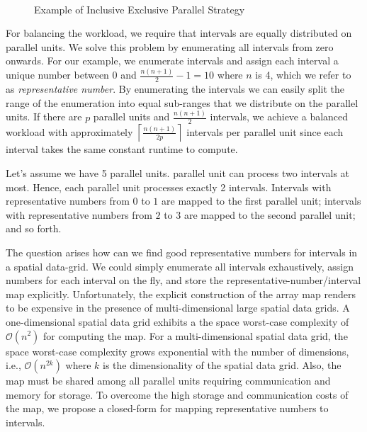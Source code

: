 \documentclass[AMA,LATO1COL]{WileyNJD-v2}
\newcommand\bigo{\mathcal O}
\begin{document}
\begin{figure}[t]
\centering
{}
~~\\
\caption{Example of Inclusive Exclusive Parallel Strategy\label{inex1d}}
\end{figure}

For balancing the workload, we require that intervals are equally
distributed on parallel units. We solve this problem by enumerating
all intervals from zero onwards.
For our example, we enumerate
intervals and assign each interval a unique number between $0$ and
$\frac{n(n+1)}{2}-1=10$ where $n$ is 4, which we refer to as
\emph{representative number}. By enumerating the intervals we can
easily split the range of the enumeration into equal sub-ranges that
we distribute on the parallel units.  If there are $p$ parallel units
and $\frac{n(n+1)}{2}$ intervals, we achieve a balanced workload with
approximately $\left \lceil \frac{n(n+1)}{2 p} \right\rceil$ intervals
per parallel unit since each interval takes the same constant runtime
to compute.

Let's assume we have 5 parallel units.  parallel unit can process
two intervals at most. Hence, each parallel unit processes exactly 2
intervals. Intervals with representative numbers from $0$ to $1$ are
mapped to the first parallel unit; intervals with representative
numbers from $2$ to $3$ are mapped to the second parallel unit; and so
forth.

The question arises how can we find good representative numbers for
intervals in a spatial data-grid. We could simply enumerate all
intervals exhaustively, assign numbers for each interval on the fly,
and store the representative-number/interval map explicitly.
Unfortunately, the explicit construction of the array map renders to
be expensive in the presence of multi-dimensional large spatial data
grids. A one-dimensional spatial data grid exhibits a the space
worst-case complexity of $\bigo(n^2)$ for computing the map. For a
multi-dimensional spatial data grid, the space worst-case complexity
grows exponential with the number of dimensions, i.e., $\bigo(n^{2k})$
where $k$ is the dimensionality of the spatial data grid. Also, the
map must be shared among all parallel units requiring communication
and memory for storage. To overcome the high storage and communication
costs of the map, we propose a closed-form for mapping representative
numbers to intervals.
\end{document}
